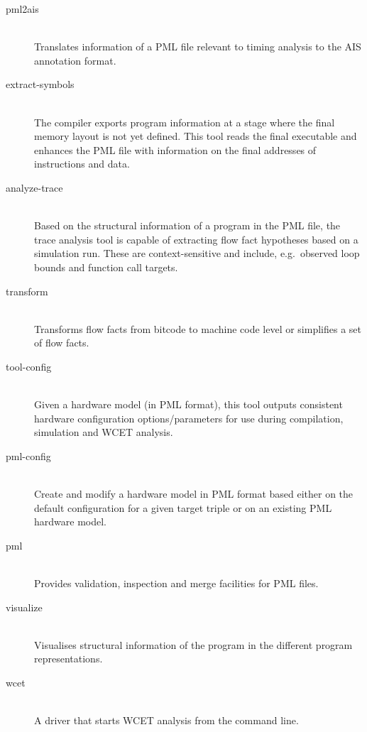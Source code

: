 \begin{description}

  \item[pml2ais] \hfill\\
    Translates information of a PML file relevant to timing analysis to
    the AIS annotation format.

  \item[extract-symbols] \hfill\\
    The compiler exports program information at a stage where the final memory
    layout is not yet defined. This tool reads the final executable and
    enhances the PML file with information on the final addresses of
    instructions and data.

  \item[analyze-trace] \hfill\\
    Based on the structural information of a program in the PML file,
    the trace analysis tool is capable of extracting flow fact hypotheses
    based on a simulation run. These are context-sensitive and include,
    e.g.\ observed loop bounds and function call targets.

  \item[transform] \hfill\\
    Transforms flow facts from bitcode to machine code level
    or simplifies a set of flow facts.

  \item[tool-config] \hfill\\
    Given a hardware model (in PML format), this tool outputs consistent
    hardware configuration options/parameters for use during compilation,
    simulation and WCET analysis.

  \item[pml-config] \hfill\\
    Create and modify a hardware model in PML format based either on the 
    default configuration for a given target triple or on an existing PML
    hardware model. 

  \item[pml] \hfill\\
    Provides validation, inspection and merge facilities for PML files.

  \item[visualize] \hfill\\
    Visualises structural information of the program in the different program
    representations.

  \item[wcet] \hfill\\
    A driver that starts WCET analysis from the command line.

\end{description}


